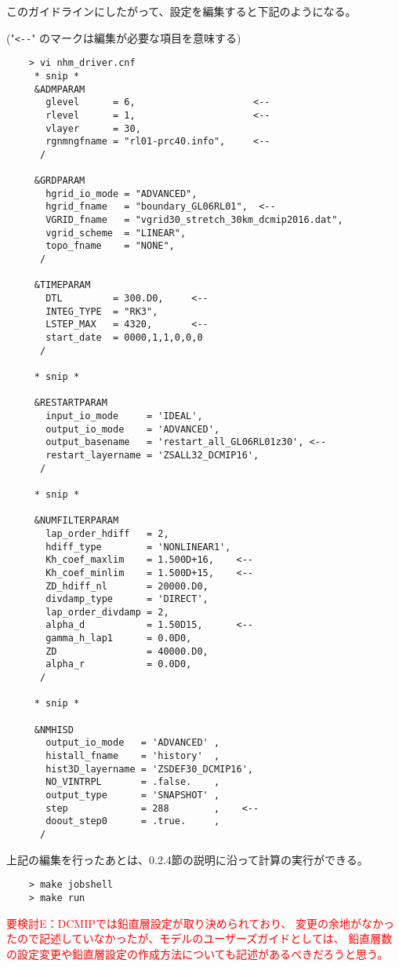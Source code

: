  \noindent このガイドラインにしたがって、設定を編集すると下記のようになる。

 ("\verb|<--|" のマークは編集が必要な項目を意味する)
 \begin{verbatim}
    > vi nhm_driver.cnf
     * snip *
     &ADMPARAM
       glevel      = 6,                     <--
       rlevel      = 1,                     <--
       vlayer      = 30,
       rgnmngfname = "rl01-prc40.info",     <--
      /

     &GRDPARAM
       hgrid_io_mode = "ADVANCED",
       hgrid_fname   = "boundary_GL06RL01",  <--
       VGRID_fname   = "vgrid30_stretch_30km_dcmip2016.dat",
       vgrid_scheme  = "LINEAR",
       topo_fname    = "NONE",
      /

     &TIMEPARAM
       DTL         = 300.D0,     <--
       INTEG_TYPE  = "RK3",
       LSTEP_MAX   = 4320,       <--
       start_date  = 0000,1,1,0,0,0
      /

     * snip *

     &RESTARTPARAM
       input_io_mode     = 'IDEAL',
       output_io_mode    = 'ADVANCED',
       output_basename   = 'restart_all_GL06RL01z30', <--
       restart_layername = 'ZSALL32_DCMIP16',
      /

     * snip *

     &NUMFILTERPARAM
       lap_order_hdiff   = 2,
       hdiff_type        = 'NONLINEAR1',
       Kh_coef_maxlim    = 1.500D+16,    <--
       Kh_coef_minlim    = 1.500D+15,    <--
       ZD_hdiff_nl       = 20000.D0,
       divdamp_type      = 'DIRECT',
       lap_order_divdamp = 2,
       alpha_d           = 1.50D15,      <--
       gamma_h_lap1      = 0.0D0,
       ZD                = 40000.D0,
       alpha_r           = 0.0D0,
      /

     * snip *

     &NMHISD
       output_io_mode   = 'ADVANCED' ,
       histall_fname    = 'history'  ,
       hist3D_layername = 'ZSDEF30_DCMIP16',
       NO_VINTRPL       = .false.    ,
       output_type      = 'SNAPSHOT' ,
       step             = 288        ,    <--
       doout_step0      = .true.     ,
      /
 \end{verbatim}

 \noindent 上記の編集を行ったあとは、0.2.4節の説明に沿って計算の実行ができる。
 \begin{verbatim}
    > make jobshell
    > make run
 \end{verbatim}


\textcolor{red}{要検討E：DCMIPでは鉛直層設定が取り決められており、
変更の余地がなかったので記述していなかったが、モデルのユーザーズガイドとしては、
鉛直層数の設定変更や鉛直層設定の作成方法についても記述があるべきだろうと思う。}
